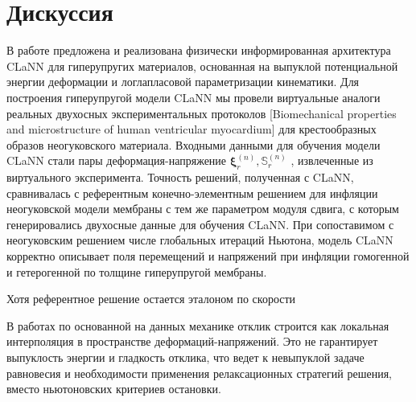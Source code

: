 \section{Дискуссия}

В работе предложена и реализована физически информированная архитектура CLaNN для гиперупругих материалов, основанная на выпуклой
потенциальной энергии деформации и лог\textendash лапласовой параметризации кинематики. 
Для построения гиперупругой модели CLaNN мы провели виртуальные аналоги реальных двухосных экспериментальных протоколов [Biomechanical properties and microstructure of human ventricular myocardium] для крестообразных образов неогуковского материала. Входными данными для обучения модели CLaNN стали пары деформация-напряжение $\boldsymbol{\xi}_r^{(n)}, \mathbb{S}_r^{(n)}$ \cite{ddaniso2024}, извлеченные из виртуального эксперимента.
Точность решений, полученная с CLaNN, сравнивалась с референтным конечно-элементным решением для инфляции неогуковской модели мембраны с тем же параметром модуля сдвига, с которым генерировались двухосные данные для обучения CLaNN. При сопоставимом с неогуковским решением числе глобальных итераций Ньютона, модель CLaNN корректно описывает поля перемещений и напряжений при инфляции гомогенной и гетерогенной по толщине гиперупругой мембраны. 

Хотя референтное решение остается эталоном по скорости

В работах по основанной на данных механике \cite{KirchdoerferOrtiz2016,ddaniso2024} отклик строится как локальная интерполяция в пространстве деформаций-напряжений. Это не гарантирует выпуклость энергии и гладкость отклика, что ведет к невыпуклой задаче равновесия и необходимости применения релаксационных стратегий решения, вместо ньютоновских критериев остановки.



